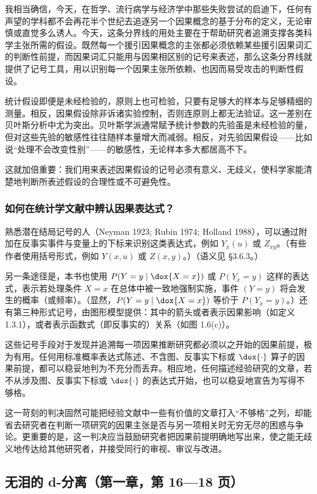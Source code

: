 我相当确信，今天，在哲学、流行病学与经济学中那些失败尝试的启迪下，任何有声望的学科都不会再花半个世纪去追逐另一个因果概念的基于分布的定义，无论审慎或直觉多么诱人。今天，这条分界线的用处主要在于帮助研究者追溯支撑各类科学主张所需的假设。既然每一个援引因果概念的主张都必须依赖某些援引因果词汇的判断性前提，而因果词汇只能用与因果相区别的记号来表述，那么这条分界线就提供了记号工具，用以识别每一个因果主张所依赖、也因而易受攻击的判断性假设。

统计假设即便是未经检验的，原则上也可检验，只要有足够大的样本与足够精细的测量。相反，因果假设除非诉诸实验控制，否则连原则上都无法验证。这一差别在贝叶斯分析中尤为突出。贝叶斯学派通常赋予统计参数的先验虽是未经检验的量，但对这些先验的敏感性往往随样本量增大而减弱。相反，对先验因果假设——比如说“处理不会改变性别”——的敏感性，无论样本多大都居高不下。

这就加倍重要：我们用来表述因果假设的记号必须有意义、无歧义，使科学家能清楚地判断所表述假设的合理性或不可避免性。

\subsubsection*{如何在统计学文献中辨认因果表达式？}

熟悉潜在结局记号的人（Neyman 1923; Rubin 1974; Holland 1988），可以通过附加在反事实事件与变量上的下标来识别这类表达式，例如 $Y_x(u)$ 或 $Z_{xy}$。（有些作者使用括号形式，例如 $Y(x,u)$ 或 $Z(x,y)$。）（语义见 \S 3.6.3。）

另一条途径是，本书也使用 $P(Y=y\mid\dox{X=x})$ 或 $P(Y_x=y)$ 这样的表达式，表示若处理条件 $X=x$ 在总体中被一致地强制实施，事件 $(Y=y)$ 将会发生的概率（或频率）。（显然，$P(Y=y\mid\dox{X=x})$ 等价于 $P(Y_x=y)$。）还有第三种形式记号，由图形模型提供：其中的箭头或者表示因果影响（如定义 1.3.1），或者表示函数式（即反事实的）关系（如图 1.6(c)）。

这些记号手段对于发现并追溯每一项因果推断研究都必须以之开始的因果前提，极为有用。任何用标准概率表达式陈述、不含图、反事实下标或 $\dox{\cdot}$ 算子的因果前提，都可以稳妥地判为不充分而丢弃。相应地，任何描述经验研究的文章，若不从涉及图、反事实下标或 $\dox{\cdot}$ 的表达式开始，也可以稳妥地宣告为写得不够格。

这一苛刻的判决固然可能把经验文献中一些有价值的文章打入“不够格”之列，却能省去研究者在判断一项研究的因果主张是否与另一项相关时无穷无尽的困惑与争论。更重要的是，这一判决应当鼓励研究者把因果前提明确地写出来，使之能无歧义地传达给其他研究者，并接受同行的审视、审议与改进。

\subsection{无泪的 d-分离（第一章，第 16—18 页）}

